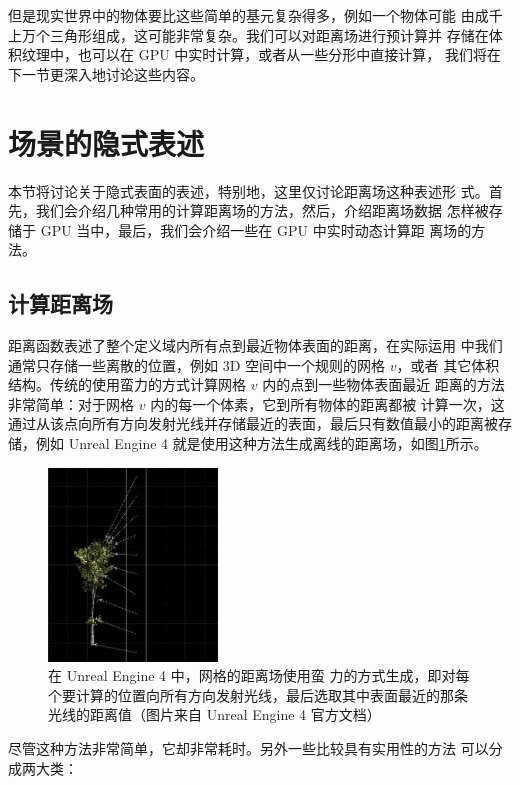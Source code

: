 但是现实世界中的物体要比这些简单的基元复杂得多，例如一个物体可能 由成千上万个三角形组成，这可能非常复杂。我们可以对距离场进行预计算并 存储在体积纹理中，也可以在 GPU 中实时计算，或者从一些分形中直接计算， 我们将在下一节更深入地讨论这些内容。



\section{场景的隐式表述}
本节将讨论关于隐式表面的表述，特别地，这里仅讨论距离场这种表述形 式。首先，我们会介绍几种常用的计算距离场的方法，然后，介绍距离场数据 怎样被存储于 GPU 当中，最后，我们会介绍一些在 GPU 中实时动态计算距 离场的方法。


\subsection{计算距离场}
距离函数表述了整个定义域内所有点到最近物体表面的距离，在实际运用 中我们通常只存储一些离散的位置，例如 3D 空间中一个规则的网格 $v$，或者 其它体积结构。传统的使用蛮力的方式计算网格 $v$ 内的点到一些物体表面最近 距离的方法非常简单：对于网格 $v$ 内的每一个体素，它到所有物体的距离都被 计算一次，这通过从该点向所有方向发射光线并存储最近的表面，最后只有数值最小的距离被存储，例如 Unreal Engine 4 就是使用这种方法生成离线的距离场，如图\ref{f:df-brute-force-method}所示。

\begin{figure}
	\sidecaption
	\includegraphics[width=0.4\textwidth]{figures/df/brute-force-method}
	\caption{在 Unreal Engine 4 中，网格的距离场使用蛮 力的方式生成，即对每个要计算的位置向所有方向发射光线，最后选取其中表面最近的那条光线的距离值（图片来自 Unreal Engine 4 官方文档）}
	\label{f:df-brute-force-method}
\end{figure}

尽管这种方法非常简单，它却非常耗时。另外一些比较具有实用性的方法 可以分成两大类：


